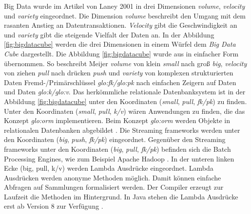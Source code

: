Big Data wurde im Artikel  von Laney 2001 in drei Dimensionen \textit{volume}, \textit{velocity} und \textit{variety} eingeordnet. Die Dimension \textit{volume} beschreibt den Umgang mit dem rasanten Anstieg an Datentransaktionen. \textit{Velocity} gibt die Geschwindigkeit an und \textit{variety} gibt die steigende Vielfalt der Daten an. In der Abbildung \ref{fig:bigdatacube} werden die drei Dimensionen in einem Würfel dem \textit{Big Data Cube} dargestellt. Die Abbildung \ref{fig:bigdatacube} wurde aus  in einfacher Form übernommen. So beschreibt Meijer \textit{volume} von klein \textit{small} nach groß \textit{big}, \textit{velocity} von ziehen \textit{pull} nach drücken \textit{push} und \textit{variety} von komplexen strukturierten Daten Fremd-/Primärschlüssel \textit{\acrshort{glo:fk}/\acrshort{glo:pk}} nach einfachen Zeigern auf Daten und Daten \textit{\acrshort{glo:k}/\acrshort{glo:v}}. Das herkömmliche relationale Datenbanksystem ist in der Abbildung \ref{fig:bigdatacube} unter den Koordinaten (\textit{small}, \textit{pull}, \textit{fk/pk}) zu finden. Unter den Koordinaten (\textit{small}, \textit{pull}, \textit{k/v}) wären Anwendungen zu finden, die das Konzept \textit{\gls{glo:orm}} implementieren. Beim Konzept \textit{\gls{glo:orm}} werden Objekte in relationalen Datenbanken abgebildet . Die Streaming frameworks werden unter den Koordinaten (\textit{big}, \textit{push}, \textit{fk/pk}) eingeordnet. Gegenüber den Streaming frameworks unter den Koordinaten (\textit{big}, \textit{pull}, \textit{fk/pk}) befinden sich die Batch Processing Engines, wie zum Beispiel Apache Hadoop . In der unteren linken Ecke (big, pull, k/v) werden Lambda Ausdrücke eingeordnet. Lambda Ausdrücken werden anonyme Methoden möglich. Damit können einfache Abfragen auf Sammlungen formalisiert werden. Der Compiler erzeugt zur Laufzeit die Methoden im Hintergrund. In Java stehen die Lambda Ausdrücke erst ab Version 8 zur Verfügung .

